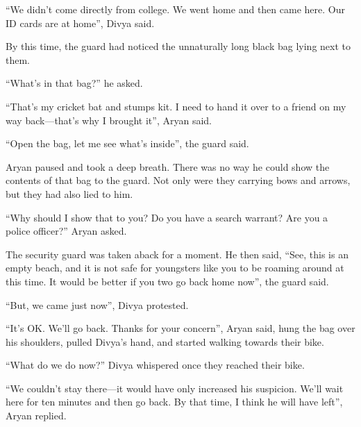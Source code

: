 “We didn't come directly from college. We went home and then came here. Our
ID cards are at home”, Divya said.

By this time, the guard had noticed the unnaturally long black bag lying next to
them.

“What's in that bag?” he asked.

“That's my cricket bat and stumps kit. I need to hand it over to a friend on my
way back—that's why I brought it”, Aryan said.

“Open the bag, let me see what's inside”, the guard said.

Aryan paused and took a deep breath. There was no way he could show the contents
of that bag to the guard. Not only were they carrying bows and arrows, but they had
also lied to him.

“Why should I show that to you? Do you have a search warrant? Are you a police officer?”
Aryan asked.

The security guard was taken aback for a moment. He then said, “See, this is an
empty beach, and it is not safe for youngsters like you to be roaming around at
this time. It would be better if you two go back home now”, the guard
said.

“But, we came just now”, Divya protested.

“It's OK. We'll go back. Thanks for your concern”, Aryan said, hung the bag over
his shoulders, pulled Divya's hand, and started walking towards their bike.

“What do we do now?” Divya whispered once they reached their bike.

“We couldn't stay there—it would have only increased his suspicion. We'll wait
here for ten minutes and then go back. By that time, I think he will have
left”, Aryan replied.